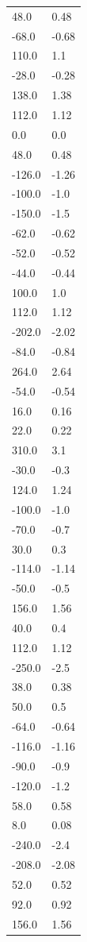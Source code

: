 \begin{longtable}{ll}
48.0 & 0.48 \\
-68.0 & -0.68 \\
110.0 & 1.1 \\
-28.0 & -0.28 \\
138.0 & 1.38 \\
112.0 & 1.12 \\
0.0 & 0.0 \\
48.0 & 0.48 \\
-126.0 & -1.26 \\
-100.0 & -1.0 \\
-150.0 & -1.5 \\
-62.0 & -0.62 \\
-52.0 & -0.52 \\
-44.0 & -0.44 \\
100.0 & 1.0 \\
112.0 & 1.12 \\
-202.0 & -2.02 \\
-84.0 & -0.84 \\
264.0 & 2.64 \\
-54.0 & -0.54 \\
16.0 & 0.16 \\
22.0 & 0.22 \\
310.0 & 3.1 \\
-30.0 & -0.3 \\
124.0 & 1.24 \\
-100.0 & -1.0 \\
-70.0 & -0.7 \\
30.0 & 0.3 \\
-114.0 & -1.14 \\
-50.0 & -0.5 \\
156.0 & 1.56 \\
40.0 & 0.4 \\
112.0 & 1.12 \\
-250.0 & -2.5 \\
38.0 & 0.38 \\
50.0 & 0.5 \\
-64.0 & -0.64 \\
-116.0 & -1.16 \\
-90.0 & -0.9 \\
-120.0 & -1.2 \\
58.0 & 0.58 \\
8.0 & 0.08 \\
-240.0 & -2.4 \\
-208.0 & -2.08 \\
52.0 & 0.52 \\
92.0 & 0.92 \\
156.0 & 1.56 \\

\end{longtable}
